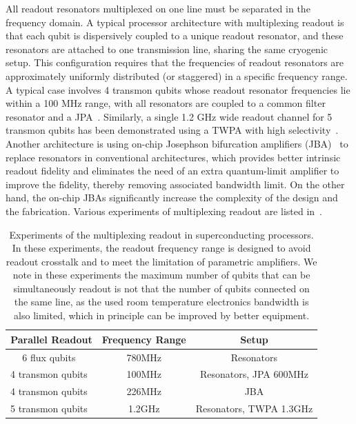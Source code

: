 \documentclass[a4paper,onecolumn,11pt,unpublished]{quantumarticle}
\begin{document}
All readout resonators multiplexed on one line must be separated in the frequency domain. A typical processor architecture with multiplexing readout is that each qubit is dispersively coupled to a unique readout resonator, and these resonators are attached to one transmission line, sharing the same cryogenic setup. This configuration requires that the frequencies of readout resonators are approximately uniformly distributed (or staggered) in a specific frequency range. A typical case involves 4 transmon qubits whose readout resonator frequencies lie within a 100 MHz range, with all resonators are coupled to a common filter resonator and a JPA~\cite{Jeffrey2014Fast}.  Similarly, a single 1.2 GHz wide readout channel for 5 transmon qubits has been demonstrated using a TWPA with high selectivity~\cite{Heinsoo2018Rapid}. Another architecture is using on-chip Josephson bifurcation amplifiers (JBA)~\cite{Vijay2009Invited,Manucharyan2007Microwave,Mallet2009Singleshot,Hao2010High} to replace resonators in conventional architectures, which provides better intrinsic readout fidelity and eliminates the need of an extra quantum-limit amplifier to improve the fidelity, thereby removing associated bandwidth limit. On the other hand, the on-chip JBAs significantly increase the complexity of the design and the fabrication. Various experiments of multiplexing readout are listed in~.

\begin{table}[!ht]
  \centering
  \begin{tabular}{ccc}
    \hline\hline
    Parallel Readout                               & Frequency Range & Setup                   \\
    \hline
    6 flux qubits~\cite{Jerger2012Frequency}        & 780MHz          & Resonators              \\
    4 transmon qubits~\cite{Jeffrey2014Fast}        & 100MHz          & Resonators, JPA 600MHz  \\
    4 transmon qubits~\cite{Schmitt2014Multiplexed} & 226MHz          & JBA                     \\
    5 transmon qubits~\cite{Heinsoo2018Rapid}       & 1.2GHz          & Resonators, TWPA 1.3GHz \\
    \hline
    \hline
  \end{tabular}
  \caption{Experiments of the multiplexing readout in superconducting processors. In these experiments, the readout frequency range is designed to avoid readout crosstalk and to meet the limitation of parametric amplifiers. We note in these experiments the maximum number of qubits that can be simultaneously readout is not that the number of qubits connected on the same line, as the used room temperature electronics bandwidth is also limited, which in principle can be improved by better equipment.}
  \label{table:multiplexing_examples}
\end{table}
\end{document}
